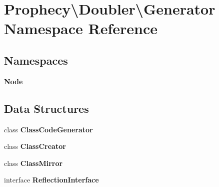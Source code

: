 \section{Prophecy\textbackslash{}Doubler\textbackslash{}Generator Namespace Reference}
\label{namespace_prophecy_1_1_doubler_1_1_generator}
\subsection*{Namespaces}
\begin{DoxyCompactItemize}
\item 
 {\bf Node}
\end{DoxyCompactItemize}
\subsection*{Data Structures}
\begin{DoxyCompactItemize}
\item 
class {\bf Class\+Code\+Generator}
\item 
class {\bf Class\+Creator}
\item 
class {\bf Class\+Mirror}
\item 
interface {\bf Reflection\+Interface}
\end{DoxyCompactItemize}
